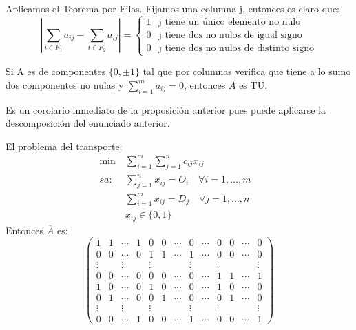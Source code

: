 \documentclass[PM.tex]{subfiles}
\begin{document}
\begin{dem}
Aplicamos el Teorema por Filas. Fijamos una columna j, entonces es claro que:
\[
\left| \sum_{i\in F_1}a_{ij}-\sum_{i\in F_2}a_{ij} \right| =
\begin{cases}
1 & \text{j tiene un único elemento no nulo}\\
0 & \text{j tiene dos no nulos de igual signo}\\
0 & \text{j tiene dos no nulos de distinto signo}
\end{cases}
\]
\end{dem}
\begin{prop}
Si A es de componentes $\{0,\pm1\}$ tal que por columnas verifica que tiene a lo sumo dos componentes no nulas y $\sum_{i=1}^m a_{ij}=0$, entonces $A$ es TU.
\end{prop}
\begin{dem}
Es un corolario inmediato de la proposición anterior pues puede aplicarse la descomposición del enunciado anterior.
\end{dem}
\begin{example}
El problema del transporte:
\begin{align*}
 \min\ & \sum_{i=1}^m\sum_{j=1}^n c_{ij}x_{ij} &\\
sa:& \sum_{j=1}^n x_{ij}= O_i \quad\forall i =1,\dots, m & \\
& \sum_{i=1}^m x_{ij}= D_j \quad \forall j =1,\dots,n &   \\
& x_{ij}\in\{0,1\} &
\end{align*}
Entonces $\overline{A}$ es:
\[\left(
\begin{array}{ccccccccccccc}
1 & 1 & \cdots & 1 & 0 & 0 &\cdots  & 0 & \cdots & 0 & 0 &  \cdots & 0\\
0 &	0 & \cdots & 0 & 1 & 1 & \cdots & 1 & \cdots & 0 & 0 & \cdots & 0\\
\vdots & &\vdots & &\vdots & & &\vdots & &\vdots & & \ & \vdots\\
0 & 0 & \cdots & 0 & 0 & 0 & \cdots & 0 & \cdots & 1 & 1 & \cdots & 1\\
1 & 0 & \cdots & 0 & 1 & 0& \cdots & 0 & \cdots  & 1 & 0 & \cdots & 0 \\
0 & 1 & \cdots & 0 & 0 & 1& \cdots & 0 & \cdots  & 0 & 1 & \cdots & 0 \\
\vdots & &\vdots & &\vdots & & &\vdots & &\vdots &   &   & \vdots\\
0 & 0 & \cdots & 1 & 0 & 0& \cdots & 1 & \cdots  & 0 & 0 & \cdots & 1
\end{array}\right)
\]
\end{example}
\end{document}
